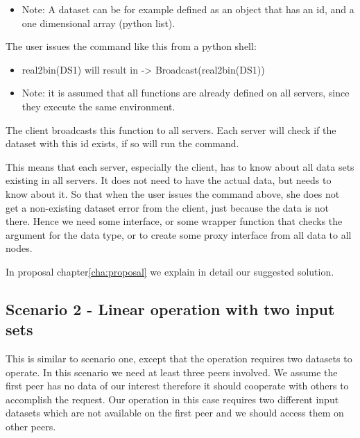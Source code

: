 \begin{itemize}
\item Note: A dataset can be for example defined as an object that has an id, and a one dimensional array (python list).
\end{itemize}

The user issues the command like this from a python shell: 

\begin{itemize}
\item real2bin(DS1) will result in -> Broadcast(real2bin(DS1))
\item Note: it is assumed that all functions are already defined on all servers, since they execute the same environment.
\end{itemize}

The client broadcasts this function to all servers. 
Each server will check if the dataset with this id exists, if so will run the command. 

This means that each server, especially the client, has to know about all data sets existing in all servers.
It does not need to have the actual data, but needs to know about it. So that when the user issues the command
above, she does not get a non-existing dataset error from the client, just because the data is not
there. Hence we need some interface, or some wrapper function that checks the argument for the data type, or to 
create some proxy interface from all data to all nodes.

In proposal chapter\ref{cha:proposal} we explain in detail our suggested solution.

\subsection{Scenario 2 - Linear operation with two input sets}
\label{sc:sc2}
This is similar to scenario one, except that the operation requires two datasets to operate. 
In this scenario we need at least three peers involved. We assume the first peer has no
data of our interest therefore it should cooperate with others to accomplish the request. 
Our operation in this case requires two 
different input datasets which are not available on the first peer and we should access them on other peers. 


